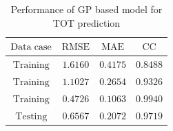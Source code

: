 \documentclass[10pt,hyperref={pdfpagelabels=false}]{beamer}
\begin{document}
\begin{frame}[fragile]
\begin{columns}
\begin{table}[h!]
\end{table}
\begin{table}[h!]
\caption{Performance of GP based model for TOT prediction} %
\centering %
\begingroup
\footnotesize
\setlength{\tabcolsep}{4.5pt} %
\renewcommand{\arraystretch}{1}
\begin{tabular}{|c | c | c | c|}
\hline %
$\mathrm{Data\hspace{0.1cm}case}$ & $\mathrm{RMSE}$ & $\mathrm{MAE}$ &$\mathrm{CC}$\\
\hline
$\mathrm{Training}$  &  $1.6160$ & $0.4175$ & $0.8488$\\
\hline
$\mathrm{Training}$   &  $1.1027$ & $0.2654$ & $0.9326$\\
\hline
$\mathrm{Training}$ &  $0.4726$ & $0.1063$ & $0.9940$\\
\hline
$\mathrm{Testing}$   &  $0.6567$ & $0.2072$ & $0.9719$\\
\hline
\end{tabular}
\endgroup
\label{tableMSEMAE} %
\end{table}
\end{columns}
\end{frame}
\end{document}
